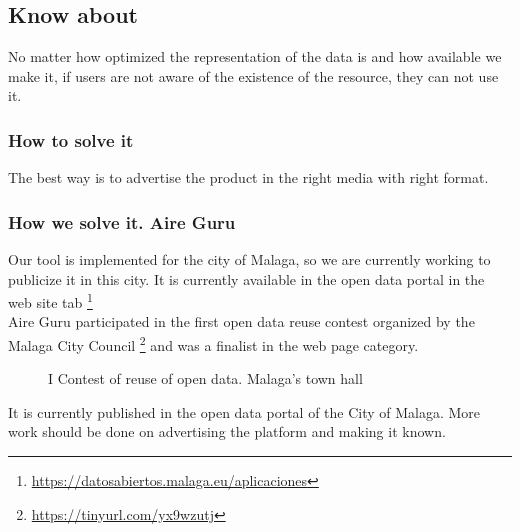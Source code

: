 \subsection{Know about}

No matter how optimized the representation of the data is and how available we make it, if users are not aware
 of the existence of the resource, they can not use it.

\subsubsection{How to solve it} 
The best way is to advertise the product in the right media with right format.
\subsubsection{How we solve it. Aire Guru} 
Our tool is implemented for the city of Malaga, so we are currently working to publicize it in this city.
It is currently available in the open data portal in the web site tab \footnote {\url {https://datosabiertos.malaga.eu/aplicaciones}} \\
Aire Guru participated in the first open data reuse contest organized by the Malaga City Council \footnote {\url {https://tinyurl.com/yx9wzutj}}
and was a finalist in the web page category.


\begin{figure}[ht]
    \centering
   \hfill
 
    \caption{I Contest of reuse of open data. Malaga's town hall}
    \end{figure}

\begin{itemize}
    \done It is currently published in the open data portal of the City of Malaga.
\crossed More work should be done on advertising the platform and making it known.
\end{itemize}
\newpage